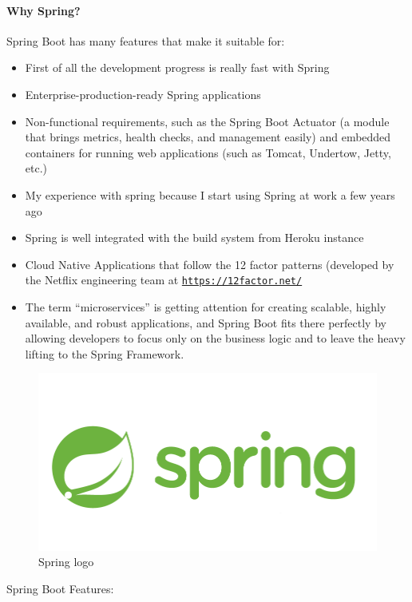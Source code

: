 \paragraph{Why Spring?} Spring Boot has many features that make it suitable for:  
\begin{itemize}
	\item First of all the development progress is really fast with Spring
	\item Enterprise-production-ready  Spring  applications  
	\item  Non-functional requirements, such as the Spring Boot Actuator (a module that brings metrics, health checks, and management easily) and embedded containers for running web applications (such as Tomcat, Undertow, Jetty, etc.)   
	\item  My experience with spring because I start using Spring at work a few years ago
	\item  Spring is well integrated with the build system from Heroku instance
	\item Cloud Native Applications that follow the 12 factor patterns (developed by the Netflix engineering team at \href{https://12factor.net/}{\texttt{https://12factor.net/}}
	\item  The term “microservices” is getting attention for creating scalable, highly available, and robust applications, and Spring Boot fits there perfectly by allowing developers to focus only on the business logic and to leave the heavy lifting to the Spring Framework. 
\end{itemize}
\begin{figure}[h]
	\centering
	\includegraphics[width=.4\linewidth]{images/spring-logo}
	\caption{Spring logo}
	\label{fig:springlogo}
\end{figure}
Spring  Boot  Features:
